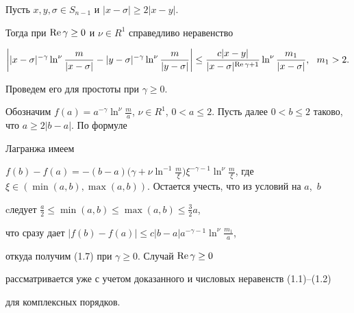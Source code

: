 \begin{lems}


Пусть $x,y, \sigma \in S_{n-1}$ и $|x-\sigma| \ge 2|x-y|$.


Тогда при $\operatorname{Re} \gamma \ge 0$ и $\nu \in R^1$ справедливо неравенство


\begin{equation}


\bigg| |x-\sigma|^{-\gamma} \ln^\nu \frac{m}{|x-\sigma|} -


|y-\sigma|^{-\gamma} \ln^\nu \frac{m}{|y-\sigma|} \bigg| \le


\frac{c |x-y|}{|x-\sigma|^{\re \gamma +1}} \ln^\nu


\frac{m_1}{|x-\sigma|},\ \ m_1>2.


\end{equation}


\end{lems}





\begin{pf}


Проведем его для простоты при $\gamma{\ge} 0$.


Обозначим $f(a) = a^{-\gamma} \ln^\nu \frac{m}{a}$, $\nu\in R^1$, $0 < a


\le 2$. Пусть далее $0 < b \le 2$ таково, что $a \ge 2|b-a|$. По формуле


Лагранжа имеем


$f(b) - f(a) = -(b-a)\big( \gamma + \nu \ln^{-


1}\frac{m}{\xi}\big)\xi^{-\gamma-1} \ln^\nu \frac{m}{\xi}$, где $\xi \in


(\min(a,b), \max(a,b))$. Остается учесть, что из условий на $a$,~$b$


cледует $\frac{a}{2}\le \min(a,b) \le \max(a,b) \leq \frac{3}{2}a$,


что сразу дает $|f(b) - f(a)|\le c|b-a|a^{-\gamma-1} \ln^\nu


\frac{m_1}{a}$,


откуда получим (1.7) при $\gamma \ge 0$. Случай $\operatorname{Re} \gamma \ge 0$


рассматривается уже с учетом доказанного и числовых неравенств (1.1)--(1.2)


для комплексных порядков.


\end{pf}





